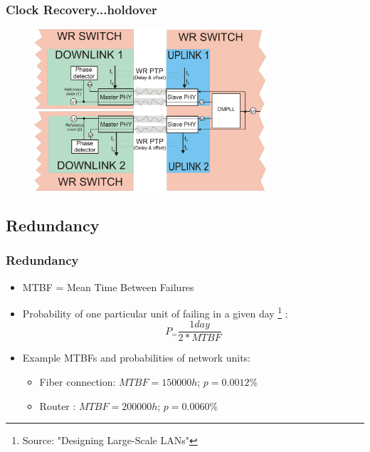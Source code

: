 \documentclass[]{beamer}
\begin{document}
\begin{frame}
  \frametitle{Clock Recovery...holdover}   %
\begin{figure}[tbp] %
  \centering

  \includegraphics[height=6cm,keepaspectratio]{robustness/layer1redundancy2.png}



\end{figure}
\end{frame}


\subsection{Redundancy}

\begin{frame}
  \frametitle{Redundancy}
	\begin{itemize}
	\item MTBF = Mean Time Between Failures
	\item Probability of one particular unit of failing in a given day \footnote{Source: "Designing Large-Scale LANs"} :
	\begin{equation}
		P_= \frac{1 day}{2*MTBF}  
	\end{equation}
	
	\item Example MTBFs and probabilities of network units:
	  \begin{itemize}
	  \item Fiber connection: $MTBF=150 000h$; $p=0.0012\%$
	  \item Router : $MTBF=200 000h$; $p=0.0060\%$
	  \end{itemize}

	\end{itemize}
\end{frame}
\end{document}
